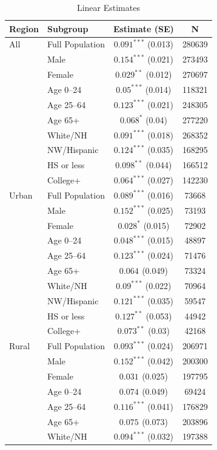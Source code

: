 \documentclass[12pt, a4paper]{article}
\begin{document}
\begin{table}[H]
\centering
\caption{Linear Estimates}
\label{tab:lin_reg_summary}
\begin{tabular}{llcc}
\toprule
\textbf{Region} & \textbf{Subgroup} & \textbf{Estimate (SE)} & \textbf{N} \\
\midrule
All & Full Population & $0.091^{***}$ (0.013) & 280639 \\
 & Male & $0.154^{***}$ (0.021) & 273493 \\
 & Female & $0.029^{**}$ (0.012) & 270697 \\
 & Age 0–24 & $0.05^{***}$ (0.014) & 118321 \\
 & Age 25–64 & $0.123^{***}$ (0.021) & 248305 \\
 & Age 65+ & $0.068^{*}$ (0.04) & 277220 \\
 & White/NH & $0.091^{***}$ (0.018) & 268352 \\
 & NW/Hispanic & $0.124^{***}$ (0.035) & 168295 \\
 & HS or less & $0.098^{**}$ (0.044) & 166512 \\
 & College+ & $0.064^{***}$ (0.027) & 142230 \\
Urban & Full Population & $0.089^{***}$ (0.016) & 73668 \\
 & Male & $0.152^{***}$ (0.025) & 73193 \\
 & Female & $0.028^{*}$ (0.015) & 72902 \\
 & Age 0–24 & $0.048^{***}$ (0.015) & 48897 \\
 & Age 25–64 & $0.123^{***}$ (0.024) & 71476 \\
 & Age 65+ & $0.064^{}$ (0.049) & 73324 \\
 & White/NH & $0.09^{***}$ (0.022) & 70964 \\
 & NW/Hispanic & $0.121^{***}$ (0.035) & 59547 \\
 & HS or less & $0.127^{**}$ (0.053) & 44942 \\
 & College+ & $0.073^{**}$ (0.03) & 42168 \\
Rural & Full Population & $0.093^{***}$ (0.024) & 206971 \\
 & Male & $0.152^{***}$ (0.042) & 200300 \\
 & Female & $0.031^{}$ (0.025) & 197795 \\
 & Age 0–24 & $0.074^{}$ (0.049) & 69424 \\
 & Age 25–64 & $0.116^{***}$ (0.041) & 176829 \\
 & Age 65+ & $0.075^{}$ (0.073) & 203896 \\
 & White/NH & $0.094^{***}$ (0.032) & 197388 \\

\end{tabular}
\end{table}
\end{document}
